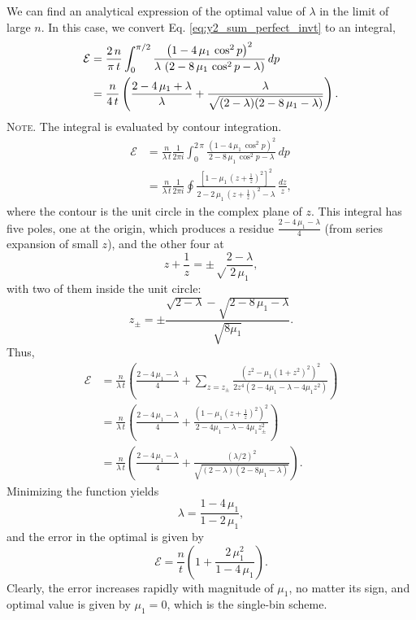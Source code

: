 \documentclass[reprint]{revtex4-1}
\newcommand{\note}[1]{{\color{DarkGreen}\footnotesize \textsc{Note.} #1}}
\begin{document}
We can find an analytical expression
of the optimal value of $\lambda$
in the limit of large $n$.
%
In this case,
we convert Eq.
\eqref{eq:y2_sum_perfect_invt}
to an integral,
$$
\begin{aligned}
\mathcal E
&=
\frac{2 \, n}{\pi \, t}
\int_0^{\pi/2}
\frac{ \left(1 - 4 \, \mu_1 \, \cos^2 p \right)^2 }
{ \lambda \, \left(2 - 8 \, \mu_1 \, \cos^2 p - \lambda \right) }
\, dp
\notag \\
&=
\frac{n}{4 \, t}
\left(
  \frac{2 - 4 \, \mu_1 + \lambda}{ \lambda }
  +
  \frac{ \lambda }
  { \sqrt{ (2 - \lambda) (2 - 8 \, \mu_1 - \lambda) } }
\right).
\end{aligned}
$$
\note{The integral is evaluated by contour integration.
$$
\begin{aligned}
\mathcal E
&=
\frac{n}{\lambda \, t}
\frac{1}{2 \pi i}
\int_0^{2 \, \pi}
\frac{ \left(1 - 4 \, \mu_1 \, \cos^2 p \right)^2 }
{ 2 - 8 \, \mu_1 \, \cos^2 p - \lambda }
\, dp
\\
&=
\frac{n}{\lambda \, t}
\frac{1}{2 \pi i}
\oint
\frac{ \left[1 - \mu_1 \, \left(z+\frac{1}{z}\right)^2 \right]^2 }
{ 2 - 2 \, \mu_1 \, \left(z + \frac{1}{z}\right)^2 - \lambda }
\, \frac{dz}{z},
\end{aligned}
$$
where the contour is the unit circle
in the complex plane of $z$.
%
This integral has five poles, one at the origin,
which produces a residue $\frac{2 - 4 \, \mu_1 - \lambda}{4}$
(from series expansion of small $z$),
and the other four at
$$
z + \frac{1}{z} = \pm\sqrt\frac{2-\lambda}{2 \, \mu_1},
$$
with two of them inside the unit circle:
$$
z_\pm = \pm \frac{\sqrt{2-\lambda} -\sqrt{2 - 8 \, \mu_1 - \lambda}}
{\sqrt{8 \mu_1}}.
$$
Thus,
$$
\begin{aligned}
  \mathcal E
&=
\frac{n}{\lambda \, t}
\left(
 \frac{2 - 4 \, \mu_1 - \lambda}{4}
 +
 \sum_{z = z_{\pm} }
 \frac{ \left(z^2 - \mu_1 (1 + z^2)^2 \right)^2 }
 { 2 z^4 (2 - 4 \mu_1 - \lambda - 4 \mu_1 z^2) }
\right)
\\
&=
\frac{n}{\lambda \, t}
\left(
  \frac{2 - 4 \, \mu_1 - \lambda}{4}
 +
 \frac{ \left(1 - \mu_1 \left(z + \frac{1}{z} \right)^2 \right)^2 }
 { 2 - 4 \mu_1 - \lambda - 4 \mu_1 z_{\pm}^2 }
\right)
\\
&=
\frac{n}{\lambda \, t}
\left(
  \frac{2 - 4 \, \mu_1 - \lambda}{4}
 +
 \frac{ (\lambda/2)^2 }
 { \sqrt{(2-\lambda) (2 - 8 \mu_1 -\lambda)} }
\right).
\end{aligned}
$$
}
%
Minimizing the function yields
%
\begin{equation}
\lambda = \frac{1 - 4 \, \mu_1} { 1 - 2 \, \mu_1 },
\label{eq:lambda_tridiag}
\end{equation}
%
and the error in the optimal is given by
%
\begin{equation}
\mathcal E
=
\frac{n}{t}
\left(
  1+ \frac{2 \, \mu_1^2}{1-4 \, \mu_1}
\right).
\label{eq:error_tridiag}
\end{equation}
%
Clearly, the error
increases rapidly with magnitude of $\mu_1$,
no matter its sign,
and optimal value is given by $\mu_1 = 0$,
which is the single-bin scheme.
\end{document}
